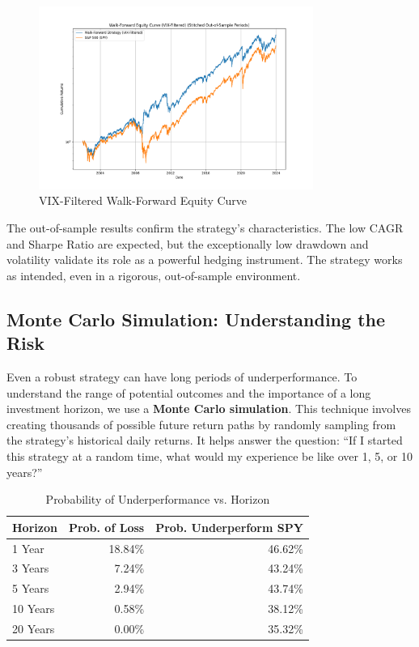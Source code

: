 \documentclass{article}
\begin{document}
\begin{figure}[htbp]
\centering
\includegraphics[width=0.8\textwidth]{plots/plot_walk_forward_vix_filtered.png}
\caption{VIX-Filtered Walk-Forward Equity Curve}
\end{figure}

The out-of-sample results confirm the strategy's characteristics. The low CAGR and Sharpe Ratio are expected, but the exceptionally low drawdown and volatility validate its role as a powerful hedging instrument. The strategy works as intended, even in a rigorous, out-of-sample environment.

\subsection{Monte Carlo Simulation: Understanding the Risk}
Even a robust strategy can have long periods of underperformance. To understand the range of potential outcomes and the importance of a long investment horizon, we use a \textbf{Monte Carlo simulation}. This technique involves creating thousands of possible future return paths by randomly sampling from the strategy's historical daily returns. It helps answer the question: ``If I started this strategy at a random time, what would my experience be like over 1, 5, or 10 years?''

\begin{table}[htbp]
\centering
\caption{Probability of Underperformance vs. Horizon}
\begin{tabular}{lrr}
\toprule
\textbf{Horizon} & \textbf{Prob. of Loss} & \textbf{Prob. Underperform SPY} \\
\midrule
1 Year  & 18.84\%        & 46.62\%                 \\
3 Years & 7.24\%         & 43.24\%                 \\
5 Years & 2.94\%         & 43.74\%                 \\
10 Years & 0.58\%         & 38.12\%                 \\
20 Years & 0.00\%         & 35.32\%                 \\
\bottomrule
\end{tabular}
\end{table}
\end{document}
